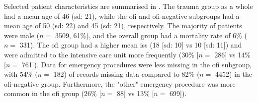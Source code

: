 \documentclass[12pt, a4paper]{article}
\begin{document}
Selected patient characteristics are summarised in . The trauma group as a whole had a mean age of 46 (\acrshort{sd}: 21), while the \acrshort{ofi} and \acrshort{ofi}-negative subgroups had a mean age of 50 (\acrshort{sd}: 22) and 45 (\acrshort{sd}: 21), respectively. The majority of patients were male ($n = $ \num{3509}, 61\%), and the overall group had a mortality rate of 6\% ($n = $ \num{331}). The \acrshort{ofi} group had a higher mean \acrshort{iss} (18 [\acrshort{sd}: 10] vs 10 [\acrshort{sd}: 11]) and were admitted to the intensive care unit more frequently (30\% [$n = $ \num{286}] vs 14\% [$n = $ \num{761}]). Data for emergency procedures were less missing in the \acrshort{ofi} subgroup, with 54\% ($n = $ 182) of records missing data compared to 82\% ($n = $ \num{4452}) in the \acrshort{ofi}-negative group. Furthermore, the "other" emergency procedure was more common in the \acrshort{ofi} group (26\% [$n = $ \num{88}] vs 13\% [$n = $ \num{699}]).
\end{document}
